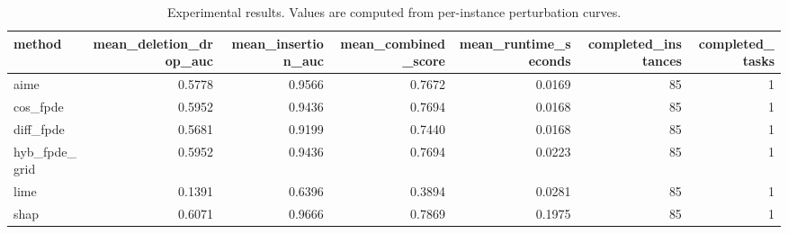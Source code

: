\begin{table}[t]
\caption{Experimental results. Values are computed from per-instance perturbation curves.}
\label{tab:main_results_computed}
\centering
\begin{tabular}{lrrrrrr}
\toprule
method & mean\_deletion\_drop\_auc & mean\_insertion\_auc & mean\_combined\_score & mean\_runtime\_seconds & completed\_instances & completed\_tasks \\
\midrule
aime & 0.5778 & 0.9566 & 0.7672 & 0.0169 & 85 & 1 \\
cos\_fpde & 0.5952 & 0.9436 & 0.7694 & 0.0168 & 85 & 1 \\
diff\_fpde & 0.5681 & 0.9199 & 0.7440 & 0.0168 & 85 & 1 \\
hyb\_fpde\_grid & 0.5952 & 0.9436 & 0.7694 & 0.0223 & 85 & 1 \\
lime & 0.1391 & 0.6396 & 0.3894 & 0.0281 & 85 & 1 \\
shap & 0.6071 & 0.9666 & 0.7869 & 0.1975 & 85 & 1 \\
\bottomrule
\end{tabular}

\end{table}
